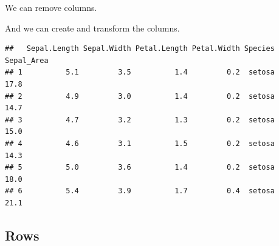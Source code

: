 \documentclass[
]{book}
\newenvironment{Shaded}{\begin{snugshade}}{\end{snugshade}}
\newcommand{\CommentTok}[1]{\textcolor[rgb]{0.56,0.35,0.01}{\textit{#1}}}
\newcommand{\ConstantTok}[1]{\textcolor[rgb]{0.00,0.00,0.00}{#1}}
\newcommand{\DecValTok}[1]{\textcolor[rgb]{0.00,0.00,0.81}{#1}}
\newcommand{\FunctionTok}[1]{\textcolor[rgb]{0.00,0.00,0.00}{#1}}
\newcommand{\NormalTok}[1]{#1}
\newcommand{\OtherTok}[1]{\textcolor[rgb]{0.56,0.35,0.01}{#1}}
\newcommand{\SpecialCharTok}[1]{\textcolor[rgb]{0.00,0.00,0.00}{#1}}
\begin{document}
We can remove columns.

\begin{Shaded}
\end{Shaded}

And we can create and transform the columns.

\begin{Shaded}
\end{Shaded}

\begin{verbatim}
##   Sepal.Length Sepal.Width Petal.Length Petal.Width Species Sepal_Area
## 1          5.1         3.5          1.4         0.2  setosa       17.8
## 2          4.9         3.0          1.4         0.2  setosa       14.7
## 3          4.7         3.2          1.3         0.2  setosa       15.0
## 4          4.6         3.1          1.5         0.2  setosa       14.3
## 5          5.0         3.6          1.4         0.2  setosa       18.0
## 6          5.4         3.9          1.7         0.4  setosa       21.1
\end{verbatim}

\hypertarget{rows}{%
\subsection{Rows}\label{rows}}
\end{document}
